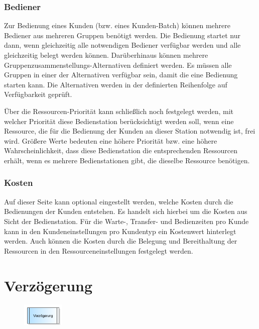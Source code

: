 \subsubsection*{Bediener}

Zur Bedienung eines Kunden (bzw. eines Kunden-Batch) können mehrere Bediener aus mehreren Gruppen benötigt werden. Die Bedienung
startet nur dann, wenn gleichzeitig alle notwendigen Bediener verfügbar werden und alle gleichzeitig belegt werden können.
Darüberhinaus können mehrere Gruppenzusammenstellungs-Alternativen definiert werden. Es müssen alle Gruppen in einer der
Alternativen verfügbar sein, damit die eine Bedienung starten kann. Die Alternativen werden in der definierten Reihenfolge
auf Verfügbarkeit geprüft. 

Über die Ressourcen-Priorität kann schließlich noch festgelegt werden, mit welcher Priorität diese Bedienstation
berücksichtigt werden soll, wenn eine Ressource, die für die Bedienung der Kunden an dieser Station notwendig ist,
frei wird. Größere Werte bedeuten eine höhere Priorität bzw. eine höhere Wahrscheinlichkeit, dass diese Bedienstation
die entsprechenden Ressourcen erhält, wenn es mehrere Bedienstationen gibt, die dieselbe Ressource benötigen.

\subsubsection*{Kosten}

Auf dieser Seite kann optional eingestellt werden, welche Kosten durch die Bedienungen der Kunden entstehen.
Es handelt sich hierbei um die Kosten aus Sicht der Bedienstation. Für die Warte-, Transfer- und Bedienzeiten pro
Kunde kann in den Kundeneinstellungen pro Kundentyp ein Kostenwert hinterlegt werden. Auch können die Kosten durch
die Belegung und Bereithaltung der Ressourcen in den Ressourceneinstellungen festgelegt werden.


\section{Verzögerung}
\label{ref:ModelElementDelay}

\begin{figure}
\vspace{-22pt}
\includegraphics[width=2cm]{imageModelElementDelay.png}
\vspace{-22pt}
\end{figure}

